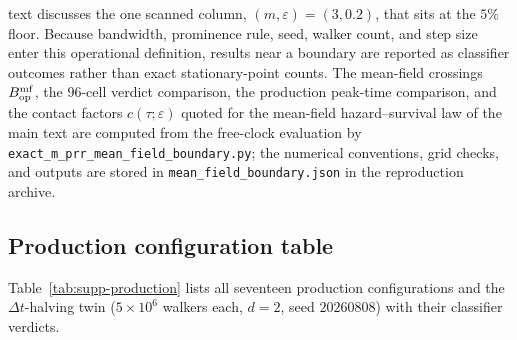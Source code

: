 \documentclass[aps,physrev,onecolumn,amsmath,amssymb,longbibliography]{revtex4-2}
\begin{document}
text discusses the one scanned column, \((m,\varepsilon)=(3,0.2)\), that
sits at the \(5\%\) floor.  Because bandwidth, prominence rule, seed,
walker count, and step size enter this operational definition, results near a
boundary are reported as classifier outcomes rather than exact stationary-point
counts.  The mean-field crossings \(B_{\rm op}^{\rm mf}\), the 96-cell
verdict comparison, the production peak-time comparison, and the contact
factors \(c(\tau;\varepsilon)\) quoted for the mean-field hazard--survival
law of the main text are computed from the free-clock evaluation by
\texttt{exact\_m\_prr\_mean\_field\_boundary.py}; the numerical
conventions, grid checks, and outputs are stored in
\texttt{mean\_field\_boundary.json} in the reproduction archive.

\subsection{Production configuration table}
\label{sec:supp-numerics-production}

Table~\ref{tab:supp-production} lists all seventeen production
configurations and the \(\Delta t\)-halving twin (\(5\times10^{6}\) walkers each, \(d=2\), seed
\(20260808\)) with their classifier verdicts.
\end{document}

